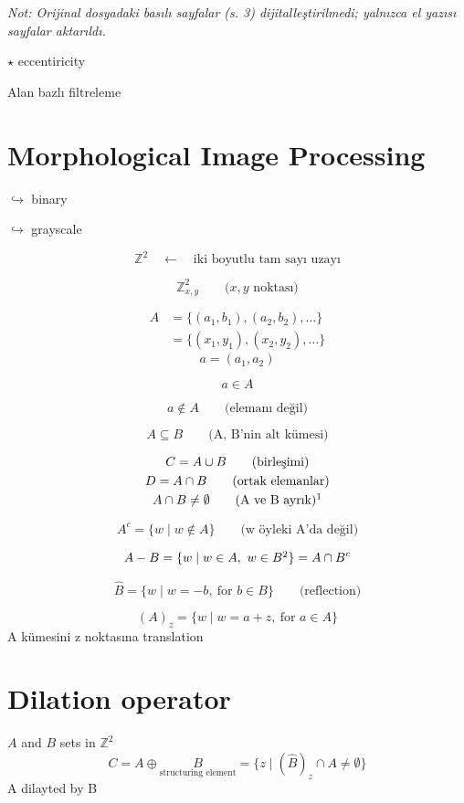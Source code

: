 \documentclass[11pt,a4paper]{article}
\begin{document}
\textit{Not: Orijinal dosyadaki basılı sayfalar (s. 3) dijitalleştirilmedi; yalnızca el yazısı sayfalar aktarıldı.}

$\star$ eccentiricity

Alan bazlı filtreleme

\section{Morphological Image Processing}
$\hookrightarrow$ binary

$\hookrightarrow$ grayscale

\[ \mathbb{Z}^2 \quad\leftarrow\quad \text{iki boyutlu tam sayı uzayı} \]

\[ \mathbb{Z}^2_{x,y} \qquad \text{($x,y$ noktası)} \]

\begin{align*}
A &= \{(a_1,b_1),(a_2,b_2),\dots\}\\
  &= \{(x_1,y_1),(x_2,y_2),\dots\}
\end{align*}
\[ a = (a_1,a_2) \]

\[ a \in A \]

\[ a \notin A \qquad \text{(elemanı değil)} \]

\[ A \subseteq B \qquad \text{(A, B'nin alt kümesi)} \]

\begin{gather*}
C = A \cup B \qquad \text{(birleşimi)}\\
D = A \cap B \qquad \text{(ortak elemanlar)}\\
A \cap B \neq \emptyset \qquad \text{(A ve B ayrık)}\footnotemark
\end{gather*}

\[ A^c = \{w \mid w \notin A\} \qquad \text{(w öyleki A'da değil)} \]

\[ A - B = \{w \mid w \in A,\ w \in B\footnotemark\} = A \cap B^c \]

\[ \hat{B} = \{w \mid w = -b,\ \text{for } b \in B\} \qquad \text{(reflection)} \]

\[ (A)_z = \{w \mid w = a + z,\ \text{for } a \in A\} \]
A kümesini z noktasına translation

\section{Dilation operator}
$A$ and $B$ sets in $\mathbb{Z}^2$
\[ C = A \oplus \underset{\text{structuring element}}{B} = \{z \mid (\hat{B})_z \cap A \neq \emptyset\} \]
A dilayted by B
\end{document}
